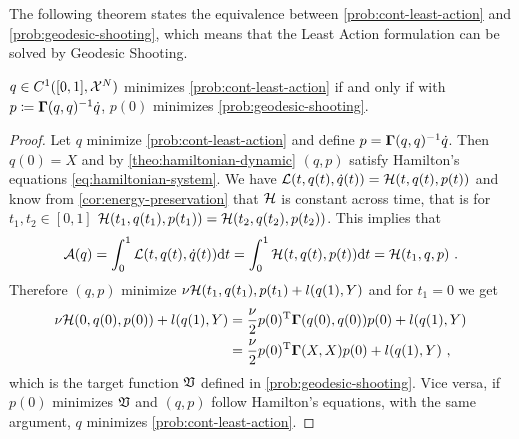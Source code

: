 The following theorem states the equivalence between \cref{prob:cont-least-action} and \cref{prob:geodesic-shooting}, which means that the Least Action formulation can be solved by Geodesic Shooting.
\begin{theorem}
	\label{theo:geodesic-shooting}
	$q \in C^1([0, 1], \mathcal{X}^N)$ minimizes \cref{prob:cont-least-action} if and only if with $p\coloneqq \mathbf{\Gamma}(q, q)^{-1}\dot{q}$, $p(0)$ minimizes \cref{prob:geodesic-shooting}.
\end{theorem}
\begin{proof}
	Let $q$ minimize \cref{prob:cont-least-action} and define $p = \mathbf{\Gamma}(q, q)^{-1}\dot{q}$.
	Then $q(0) = X$ and by \cref{theo:hamiltonian-dynamic} $(q, p)$ satisfy Hamilton's equations \ref{eq:hamiltonian-system}.
	We have $\mathcal{L}(t, q(t), \dot{q}(t)) = \mathcal{H}(t, q(t), p(t))$ and know from \cref{cor:energy-preservation} that $\mathcal{H}$ is constant across time, that is for $t_1, t_2 \in [0, 1]$ $\mathcal{H}(t_1, q(t_1), p(t_1)) = \mathcal{H}(t_2, q(t_2), p(t_2))$.
	This implies that
	\begin{equation}
	\mathcal{A}(q) = \int_{0}^{1} \cL(t, q(t), \dot{q}(t)) \mathrm{d}t 
	= \int_{0}^{1} \cH(t, q(t), p(t)) \mathrm{d}t = \cH(t_1, q, p) \ .
	\end{equation}
	Therefore $(q, p)$ minimize $\nu \mathcal{H}(t_1, q(t_1), p(t_1) + l(q(1), Y)$ and for $t_1 = 0$ we get
	\begin{align}
	\nu \mathcal{H}(0, q(0), p(0)) + l(q(1), Y) &= \frac{\nu}{2} p(0)^{\mathrm{T}} \mathbf{\Gamma}(q(0), q(0))p(0) + l(q(1), Y)\\
	&= \frac{\nu}{2} p(0)^{\mathrm{T}} \mathbf{\Gamma}(X, X)p(0) + l(q(1), Y) \ ,
	\end{align}
	which is the target function $\mathfrak{V}$ defined in \cref{prob:geodesic-shooting}.
	Vice versa, if $p(0)$ minimizes $\mathfrak{V}$ and $(q, p)$ follow Hamilton's equations, with the same argument, $q$ minimizes \cref{prob:cont-least-action}.
\end{proof}

